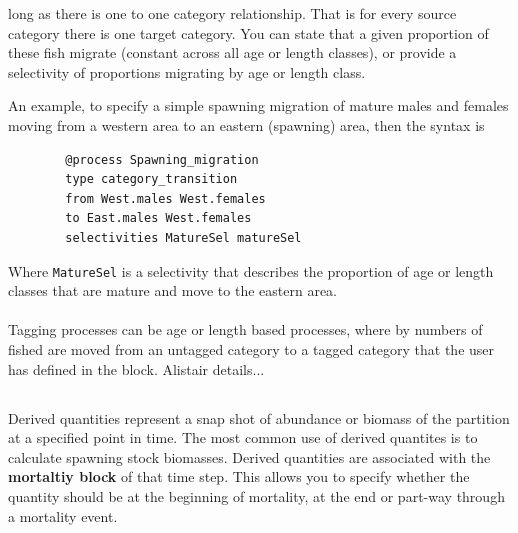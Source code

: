  long as there is one to one category relationship. That is for every source category there is one target category. You can state that a given proportion of these fish migrate (constant across all age or length classes), or provide a selectivity of proportions migrating by age or length class.

An example, to specify a simple spawning migration of mature males and females moving from a western area to an eastern (spawning) area, then the syntax is
{\small{\begin{verbatim}
		@process Spawning_migration
		type category_transition 
		from West.males	West.females	
		to East.males West.females	
		selectivities MatureSel matureSel
		\end{verbatim}}}

Where \texttt{MatureSel} is a selectivity that describes the proportion of age or length classes that are mature and move to the eastern area.


\paragraph{}
Tagging processes can be age or length based processes, where by numbers of fished are moved from an untagged category to a tagged category that the user has defined in the  block. Alistair details...

\paragraph{}

\subsection{\label{sec:derived-quantities}}
Derived quantities represent a snap shot of abundance or biomass of the partition at a specified point in time. The most common use of derived quantites is to calculate spawning stock biomasses. Derived quantities are associated with the \textbf{mortaltiy block} of that time step. This allows you to specify whether the quantity should be at the beginning of mortality, at the end or part-way through a mortality event.

\subsection{\label{sec:age-at-age}}

